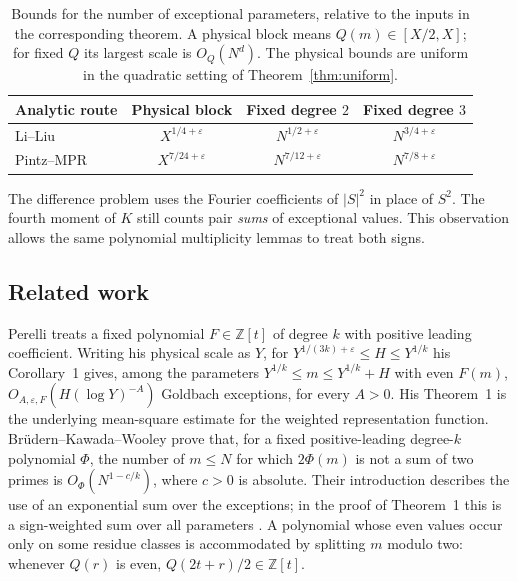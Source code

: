 \documentclass[11pt]{article}
\theoremstyle{definition}
\theoremstyle{remark}
\numberwithin{equation}{section}
\newcommand{\eps}{\varepsilon}
\newcommand{\Z}{\mathbb Z}
\begin{document}
\begin{table}[ht]
\centering
\begin{tabular}{@{}lccc@{}}
\toprule
Analytic route & Physical block & Fixed degree $2$ & Fixed degree $3$\\
\midrule
Li--Liu & $X^{1/4+\eps}$ & $N^{1/2+\eps}$ & $N^{3/4+\eps}$\\
Pintz--MPR & $X^{7/24+\eps}$ & $N^{7/12+\eps}$ & $N^{7/8+\eps}$\\
\bottomrule
\end{tabular}
\caption{Bounds for the number of exceptional parameters, relative to
the inputs in the corresponding theorem. A physical block means
$Q(m)\in[X/2,X]$; for fixed $Q$ its largest scale is $O_Q(N^d)$.
The physical bounds are uniform in the quadratic setting of
Theorem~\ref{thm:uniform}.}\label{tab:exponents}
\end{table}

The difference problem uses the Fourier coefficients of $|S|^2$ in
place of $S^2$. The fourth moment of $K$ still counts pair \emph{sums}
of exceptional values. This observation allows the same polynomial
multiplicity lemmas to treat both signs.

\subsection{Related work}\label{sec:related}

Perelli \cite[Theorem~1 and Corollary~1]{Perelli} treats a fixed
polynomial $F\in\Z[t]$ of degree $k$ with positive leading coefficient.
Writing his physical scale as $Y$, for
$Y^{1/(3k)+\eps}\le H\le Y^{1/k}$ his Corollary~1 gives, among the
parameters $Y^{1/k}\le m\le Y^{1/k}+H$ with even $F(m)$,
$O_{A,\eps,F}(H(\log Y)^{-A})$ Goldbach exceptions, for every $A>0$.
His Theorem~1 is the underlying mean-square estimate for the weighted
representation function. Br\"udern--Kawada--Wooley
\cite[Theorem~1]{BKW} prove that, for a fixed positive-leading
degree-$k$ polynomial $\Phi$, the number of $m\le N$ for which
$2\Phi(m)$ is not a sum of two primes is
$O_\Phi(N^{1-c/k})$, where $c>0$ is absolute. Their introduction
describes the use of an exponential sum over the exceptions; in the
proof of Theorem~1 this is a sign-weighted sum over all parameters
\cite[\S2, (5)]{BKW}. A polynomial
whose even values occur only on some residue classes is accommodated
by splitting $m$ modulo two: whenever $Q(r)$ is even,
$Q(2t+r)/2\in\Z[t]$.
\end{document}
